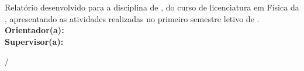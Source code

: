 \begin{center}	
	\textsc{\titulo}
\end{center}

\vspace{2cm}	

\begin{center}
	\autor
\end{center}

\vspace{2.5cm}

\hfill \parbox{8.5cm}{\noindent
Relatório desenvolvido para a disciplina de \disciplina , do curso de licenciatura em Física da \instituicao, apresentando as atividades realizadas no primeiro semestre letivo de \ano.\vspace{.5cm}\\
\textbf{Orientador(a):} \orientador \\
\textbf{Supervisor(a):} \coorientador}
\vfill

\vspace{2.0cm}

\begin{center}
\cidade/\estado

\mes \ano
\end{center}

\newpage